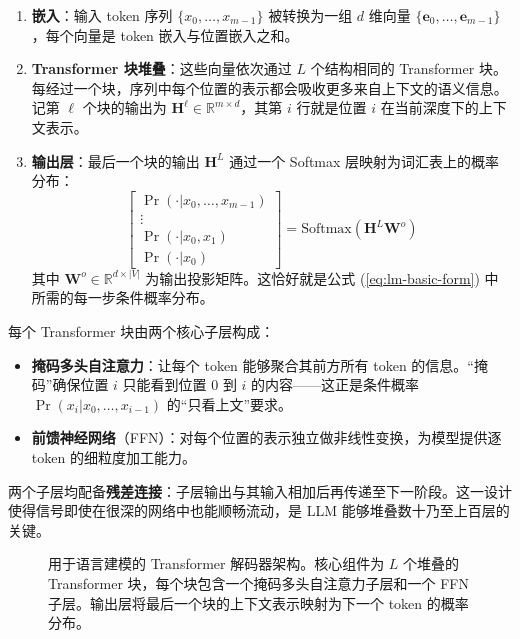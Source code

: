 \begin{enumerate}
  \item \textbf{嵌入}：输入 token 序列 $\{x_0,\dots,x_{m-1}\}$ 被转换为一组 $d$ 维向量 $\{\mathbf{e}_0,\dots,\mathbf{e}_{m-1}\}$，每个向量是 token 嵌入与位置嵌入之和。
  \item \textbf{Transformer 块堆叠}：这些向量依次通过 $L$ 个结构相同的 Transformer 块。每经过一个块，序列中每个位置的表示都会吸收更多来自上下文的语义信息。记第 $\ell$ 个块的输出为 $\mathbf{H}^{\ell} \in \mathbb{R}^{m \times d}$，其第 $i$ 行就是位置 $i$ 在当前深度下的上下文表示。
  \item \textbf{输出层}：最后一个块的输出 $\mathbf{H}^{L}$ 通过一个 Softmax 层映射为词汇表上的概率分布：
  \begin{equation}
    \begin{bmatrix} \Pr(\cdot|x_0,\dots,x_{m-1}) \\ \vdots \\ \Pr(\cdot|x_0,x_1) \\ \Pr(\cdot|x_0) \end{bmatrix}
    = \mathrm{Softmax}(\mathbf{H}^{L} \mathbf{W}^{o})
    \label{eq:lm-output-layer}
  \end{equation}
  其中 $\mathbf{W}^{o} \in \mathbb{R}^{d \times |V|}$ 为输出投影矩阵。这恰好就是公式 (\ref{eq:lm-basic-form}) 中所需的每一步条件概率分布。
\end{enumerate}

每个 Transformer 块由两个核心子层构成：

\begin{itemize}
  \item \textbf{掩码多头自注意力}：让每个 token 能够聚合其前方所有 token 的信息。``掩码''确保位置 $i$ 只能看到位置 $0$ 到 $i$ 的内容——这正是条件概率 $\Pr(x_i|x_0,\dots,x_{i-1})$ 的``只看上文''要求。
  \item \textbf{前馈神经网络}（FFN）：对每个位置的表示独立做非线性变换，为模型提供逐 token 的细粒度加工能力。
\end{itemize}

两个子层均配备\textbf{残差连接}：子层输出与其输入相加后再传递至下一阶段。这一设计使得信号即使在很深的网络中也能顺畅流动，是 LLM 能够堆叠数十乃至上百层的关键。

\begin{figure}[!t]
\centering

\caption{用于语言建模的 Transformer 解码器架构。核心组件为 $L$ 个堆叠的 Transformer 块，每个块包含一个掩码多头自注意力子层和一个 FFN 子层。输出层将最后一个块的上下文表示映射为下一个 token 的概率分布。}
\label{fig:llm-transformer-decoder}
\end{figure}

